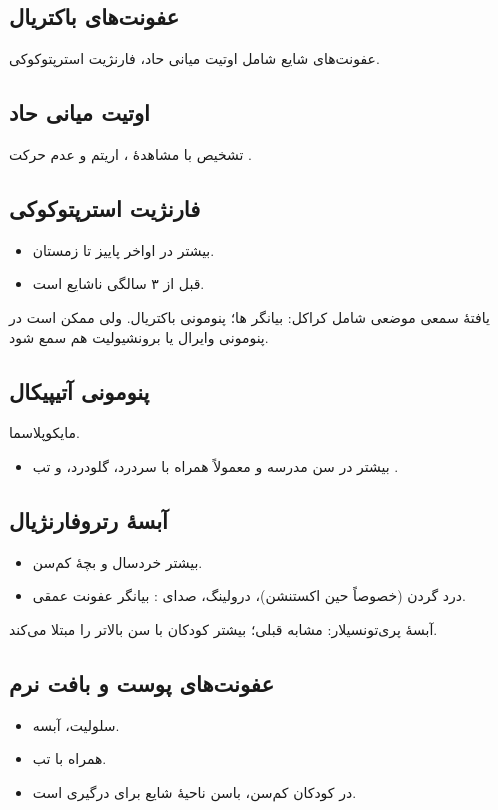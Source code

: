 \documentclass[12pt,a4paper]{article}
\begin{document}
\subsection*{عفونت‌های باکتریال}
عفونت‌های شایع شامل اوتیت میانی حاد، فارنژیت استرپتوکوکی.

\subsection*{اوتیت میانی حاد}
تشخیص با مشاهدهٔ ، اریتم و عدم حرکت .

\subsection*{فارنژیت استرپتوکوکی}
\begin{itemize}
\item بیشتر در اواخر پاییز تا زمستان.
\item قبل از ۳ سالگی ناشایع است.
\end{itemize}

یافتهٔ سمعی موضعی شامل کراکل: بیانگر ها؛ پنومونی باکتریال.
ولی ممکن است در پنومونی وایرال یا برونشیولیت هم سمع شود.

\subsection*{پنومونی آتیپیکال}
مایکوپلاسما.
\begin{itemize}
\item بیشتر در سن مدرسه و معمولاً همراه با سردرد، گلودرد،  و تب .
\end{itemize}

\subsection*{آبسهٔ رتروفارنژیال}
\begin{itemize}
\item بیشتر خردسال و بچهٔ کم‌سن.
\item درد گردن (خصوصاً حین اکستنشن)، درولینگ، صدای : بیانگر عفونت عمقی.
\end{itemize}
آبسهٔ پری‌تونسیلار: مشابه قبلی؛ بیشتر کودکان با سن بالاتر را مبتلا می‌کند.

\subsection*{عفونت‌های پوست و بافت نرم}
\begin{itemize}
\item سلولیت، آبسه.
\item همراه با تب.
\item در کودکان کم‌سن، باسن ناحیهٔ شایع برای درگیری است.
\end{itemize}
\end{document}
